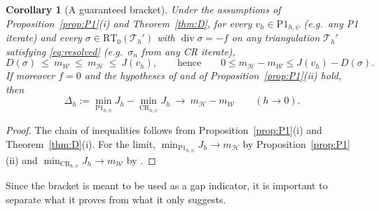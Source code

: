 \documentclass[11pt]{amsart}
\newtheorem{corollary}[theorem]{Corollary}
\theoremstyle{definition}
\theoremstyle{remark}
\numberwithin{equation}{section}
\newcommand{\CR}{\mathrm{CR}}
\newcommand{\Pone}{\mathrm{P1}}
\newcommand{\RT}{\mathrm{RT}_0}
\newcommand{\Th}{\mathcal T_h}
\newcommand{\mW}{m_{\mathcal W}}
\newcommand{\mH}{m_{\mathcal H}}
\DeclareMathOperator{\divg}{div}
\begin{document}
\begin{corollary}[A guaranteed bracket]\label{cor:bracket}
Under the assumptions of Proposition~\ref{prop:P1}(i) and Theorem~\ref{thm:D}, for every $v_h\in \Pone_{h,\psi}$ \textup(e.g.\ any P1 iterate\textup) and every $\sigma\in\RT(\Th')$ with $\divg\sigma=-f$ on any triangulation $\Th'$ satisfying \eqref{eq:resolved} \textup(e.g.\ $\sigma_n$ from any CR iterate\textup),
\[
D(\sigma)\ \le\ \mW\ \le\ \mH\ \le\ J(v_h),\qquad\text{hence}\qquad 0\le\mH-\mW\le J(v_h)-D(\sigma).
\]
If moreover $f=0$ and the hypotheses of \cite[Thm.~1]{BalciOrtnerStorn2022} and of Proposition~\ref{prop:P1}(ii) hold, then
\[
\Delta_h:=\min_{\Pone_{h,\psi}}J_h-\min_{\CR_{h,\psi}}J_h\ \to\ \mH-\mW\qquad(h\to0).
\]
\end{corollary}
\begin{proof}
The chain of inequalities follows from Proposition~\ref{prop:P1}(i) and Theorem~\ref{thm:D}(i). For the limit, $\min_{\Pone_{h,\psi}}J_h\to\mH$ by Proposition~\ref{prop:P1}(ii) and $\min_{\CR_{h,\psi}}J_h\to\mW$ by \cite[Thm.~1]{BalciOrtnerStorn2022}.
\end{proof}

Since the bracket is meant to be used as a gap indicator, it is important to separate what it proves from what it only suggests.
\end{document}
